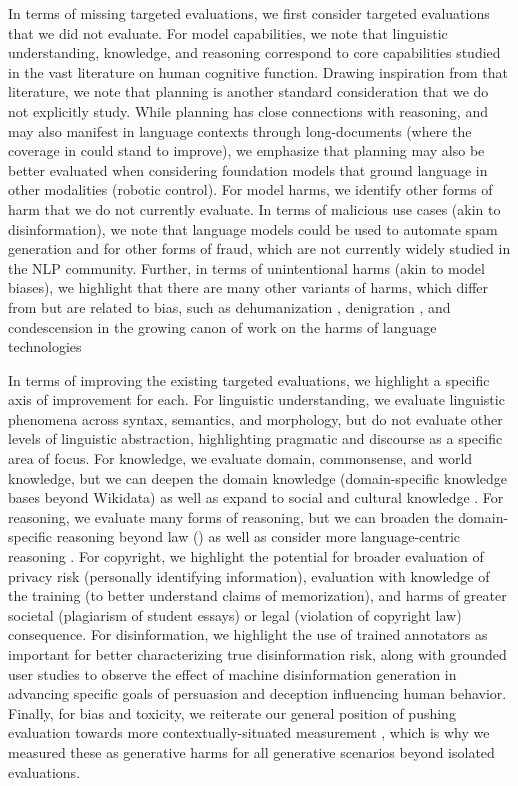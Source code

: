 In terms of missing targeted evaluations, we first consider targeted evaluations that we did not evaluate.
For model capabilities, we note that linguistic understanding, knowledge, and reasoning correspond to core capabilities studied in the vast literature on human cognitive function.
Drawing inspiration from that literature, we note that planning is another standard consideration that we do not explicitly study.
While planning has close connections with reasoning, and may also manifest in language contexts through long-documents (where the coverage in \benchmarkname could stand to improve), we emphasize that planning may also be better evaluated when considering foundation models that ground language in other modalities (\eg robotic control). 
For model harms, we identify other forms of harm that we do not currently evaluate.
In terms of malicious use cases (akin to disinformation), we note that language models could be used to automate spam generation and for other forms of fraud, which are not currently widely studied in the NLP community.
Further, in terms of unintentional harms (akin to model biases), we highlight that there are many other variants of harms, which differ from but are related to bias, such as dehumanization \citep{mendelsohn2020framework}, denigration \citep{caines2018aggressive}, and condescension \citep{wang2019talkdown} in the growing canon of work on the harms of language technologies \citep{bender2021dangers, weidinger2022taxonomy, rauh2022characteristics, kirk2022handling} 

In terms of improving the existing targeted evaluations, we highlight a specific axis of improvement for each.
For linguistic understanding, we evaluate linguistic phenomena across syntax, semantics, and morphology, but do not evaluate other levels of linguistic abstraction, highlighting pragmatic and discourse as a specific area of focus.
For knowledge, we evaluate domain, commonsense, and world knowledge, but we can deepen the domain knowledge (\eg domain-specific knowledge bases beyond Wikidata) as well as expand to social and cultural knowledge \citep[\eg SocialIQA;][]{sap2019socialiqa}.
For reasoning, we evaluate many forms of reasoning, but we can broaden the domain-specific reasoning beyond law (\ie \legalsupport) as well as consider more language-centric reasoning \citep[\eg multi-hop reasoning as in HotPotQA;][]{yang2018hotpotqa}.
For copyright, we highlight the potential for broader evaluation of privacy risk (\eg personally identifying information), evaluation with knowledge of the training (to better understand claims of memorization), and harms of greater societal (\eg plagiarism of student essays) or legal (\eg violation of copyright law) consequence. 
For disinformation, we highlight the use of trained annotators as important for better characterizing true disinformation risk, along with grounded user studies to observe the effect of machine disinformation generation in advancing specific goals of persuasion and deception influencing human behavior.
Finally, for bias and toxicity, we reiterate our general position of pushing evaluation towards more contextually-situated measurement \citep[see][]{rauh2022characteristics}, which is why we measured these as generative harms for all generative scenarios beyond isolated evaluations. 

